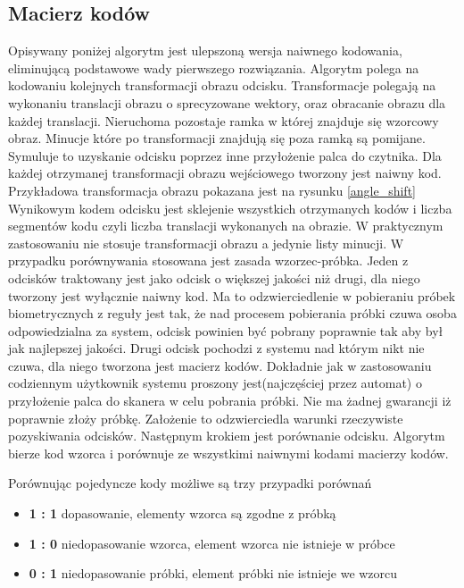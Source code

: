 \subsection[Algorytm Kodujący][Macierz kodów]{Macierz kodów} 
Opisywany poniżej algorytm jest ulepszoną wersja naiwnego kodowania, eliminującą podstawowe wady pierwszego rozwiązania. Algorytm polega na kodowaniu kolejnych transformacji obrazu odcisku. Transformacje polegają na 
wykonaniu translacji obrazu o sprecyzowane wektory, oraz obracanie 
obrazu dla każdej translacji. Nieruchoma pozostaje ramka w której znajduje się wzorcowy obraz. Minucje które po transformacji znajdują się poza ramką są pomijane. Symuluje to uzyskanie odcisku poprzez 
inne przyłożenie palca do czytnika. Dla każdej otrzymanej transformacji obrazu wejściowego tworzony jest naiwny kod. Przykładowa transformacja obrazu pokazana jest na rysunku \ref{angle_shift} Wynikowym 
kodem odcisku jest sklejenie wszystkich otrzymanych kodów i liczba segmentów kodu czyli liczba translacji wykonanych na obrazie. W praktycznym zastosowaniu nie stosuje transformacji obrazu a jedynie listy 
minucji. W przypadku porównywania stosowana jest zasada wzorzec-próbka. Jeden z odcisków traktowany jest jako odcisk o większej jakości niż drugi, dla niego tworzony jest wyłącznie naiwny kod. Ma to 
odzwierciedlenie w pobieraniu próbek biometrycznych z reguły jest tak, że nad procesem pobierania próbki czuwa osoba odpowiedzialna za system,  odcisk powinien być pobrany poprawnie tak aby był jak 
najlepszej jakości. Drugi odcisk pochodzi z systemu nad którym nikt nie czuwa, dla niego tworzona jest macierz kodów. Dokładnie jak w zastosowaniu codziennym użytkownik systemu proszony jest(najczęściej 
przez automat) o przyłożenie palca do skanera w celu pobrania próbki. Nie ma żadnej gwarancji iż poprawnie złoży próbkę. Założenie to odzwierciedla warunki rzeczywiste pozyskiwania odcisków. Następnym 
krokiem jest porównanie odcisku. Algorytm bierze kod wzorca i porównuje ze wszystkimi 
naiwnymi kodami macierzy kodów. 
\par 
Porównując pojedyncze kody możliwe są trzy przypadki porównań
\renewcommand*{\labelitemi}{\bullet}
\begin{itemize}
\item \textbf{1 : 1} dopasowanie, elementy wzorca są zgodne z próbką
\item \textbf{1 : 0} niedopasowanie wzorca, element wzorca nie istnieje w próbce
\item \textbf{0 : 1} niedopasowanie próbki, element próbki nie istnieje we wzorcu
\end{itemize}
